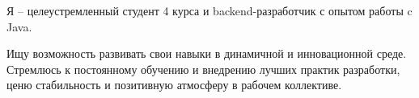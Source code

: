 \par{
Я -- целеустремленный студент 4 курса и backend-разработчик с опытом работы c Java.

Ищу возможность развивать свои навыки в динамичной и инновационной среде.
Стремлюсь к постоянному обучению и внедрению лучших практик разработки, ценю стабильность и позитивную атмосферу в рабочем коллективе.
}
\vspace{1em}
